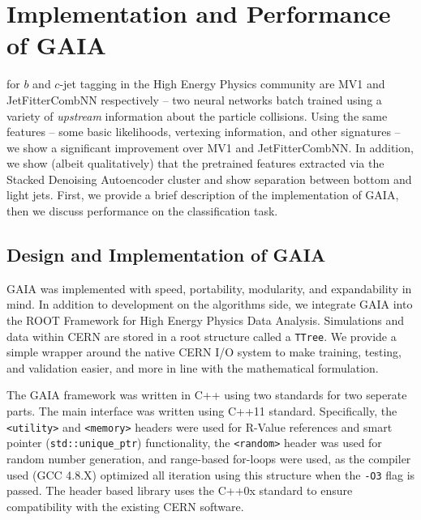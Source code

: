 \chapter{Implementation and Performance of GAIA}
 for $b$ and $c$-jet tagging in the High Energy Physics community are MV1 and JetFitterCombNN respectively -- two neural networks batch trained using a variety of \emph{upstream} information about the particle collisions. Using the same features -- some basic likelihoods, vertexing information, and other signatures -- we show a significant improvement over MV1 and JetFitterCombNN. In addition, we show (albeit qualitatively) that the pretrained features extracted via the Stacked Denoising Autoencoder cluster and show separation between bottom and light jets. First, we provide a brief description of the implementation of GAIA, then we discuss performance on the classification task.

\section{Design and Implementation of GAIA}
GAIA was implemented with speed, portability, modularity, and expandability in mind. In addition to development on the algorithms side, we integrate GAIA into the ROOT \citep{ROOT} Framework for High Energy Physics Data Analysis. Simulations and data within CERN are stored in a root structure called a \texttt{TTree}. We provide a simple wrapper around the native CERN I/O system to make training, testing, and validation easier, and more in line with the mathematical formulation.

The GAIA framework was written in C++ using two standards for two seperate parts. The main interface was written using C++11 standard. Specifically, the \texttt{<utility>} and \texttt{<memory>} headers were used for R-Value references and smart pointer (\texttt{std::unique\_{}ptr}) functionality, the \texttt{<random>} header was used for random number generation, and range-based for-loops were used, as the compiler used (GCC 4.8.X) optimized all iteration using this structure when the \texttt{-O3} flag is passed. The header based library uses the C++0x standard to ensure compatibility with the existing CERN software.






